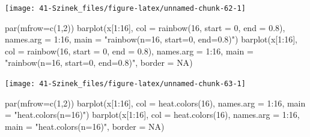 \documentclass[
]{book}
\newenvironment{Shaded}{\begin{snugshade}}{\end{snugshade}}
\newcommand{\AttributeTok}[1]{\textcolor[rgb]{0.77,0.63,0.00}{#1}}
\newcommand{\ConstantTok}[1]{\textcolor[rgb]{0.00,0.00,0.00}{#1}}
\newcommand{\DecValTok}[1]{\textcolor[rgb]{0.00,0.00,0.81}{#1}}
\newcommand{\FloatTok}[1]{\textcolor[rgb]{0.00,0.00,0.81}{#1}}
\newcommand{\FunctionTok}[1]{\textcolor[rgb]{0.00,0.00,0.00}{#1}}
\newcommand{\NormalTok}[1]{#1}
\newcommand{\SpecialCharTok}[1]{\textcolor[rgb]{0.00,0.00,0.00}{#1}}
\newcommand{\StringTok}[1]{\textcolor[rgb]{0.31,0.60,0.02}{#1}}
\begin{document}
\begin{center}\texttt{[image: 41-Szinek\_files/figure-latex/unnamed-chunk-62-1]} \end{center}

\begin{Shaded}
\begin{Highlighting}[]
\FunctionTok{par}\NormalTok{(}\AttributeTok{mfrow=}\FunctionTok{c}\NormalTok{(}\DecValTok{1}\NormalTok{,}\DecValTok{2}\NormalTok{))}
\FunctionTok{barplot}\NormalTok{(x[}\DecValTok{1}\SpecialCharTok{:}\DecValTok{16}\NormalTok{], }\AttributeTok{col =} \FunctionTok{rainbow}\NormalTok{(}\DecValTok{16}\NormalTok{, }\AttributeTok{start =} \DecValTok{0}\NormalTok{, }\AttributeTok{end =} \FloatTok{0.8}\NormalTok{), }\AttributeTok{names.arg =} \DecValTok{1}\SpecialCharTok{:}\DecValTok{16}\NormalTok{, }
    \AttributeTok{main =} \StringTok{"rainbow(n=16, start=0, end=0.8)"}\NormalTok{)}
\FunctionTok{barplot}\NormalTok{(x[}\DecValTok{1}\SpecialCharTok{:}\DecValTok{16}\NormalTok{], }\AttributeTok{col =} \FunctionTok{rainbow}\NormalTok{(}\DecValTok{16}\NormalTok{, }\AttributeTok{start =} \DecValTok{0}\NormalTok{, }\AttributeTok{end =} \FloatTok{0.8}\NormalTok{), }\AttributeTok{names.arg =} \DecValTok{1}\SpecialCharTok{:}\DecValTok{16}\NormalTok{, }
    \AttributeTok{main =} \StringTok{"rainbow(n=16, start=0, end=0.8)"}\NormalTok{, }\AttributeTok{border =} \ConstantTok{NA}\NormalTok{)}
\end{Highlighting}
\end{Shaded}

\begin{center}\texttt{[image: 41-Szinek\_files/figure-latex/unnamed-chunk-63-1]} \end{center}

\begin{Shaded}
\begin{Highlighting}[]
\FunctionTok{par}\NormalTok{(}\AttributeTok{mfrow=}\FunctionTok{c}\NormalTok{(}\DecValTok{1}\NormalTok{,}\DecValTok{2}\NormalTok{))}
\FunctionTok{barplot}\NormalTok{(x[}\DecValTok{1}\SpecialCharTok{:}\DecValTok{16}\NormalTok{], }\AttributeTok{col =} \FunctionTok{heat.colors}\NormalTok{(}\DecValTok{16}\NormalTok{), }\AttributeTok{names.arg =} \DecValTok{1}\SpecialCharTok{:}\DecValTok{16}\NormalTok{, }\AttributeTok{main =} \StringTok{"heat.colors(n=16)"}\NormalTok{)}
\FunctionTok{barplot}\NormalTok{(x[}\DecValTok{1}\SpecialCharTok{:}\DecValTok{16}\NormalTok{], }\AttributeTok{col =} \FunctionTok{heat.colors}\NormalTok{(}\DecValTok{16}\NormalTok{), }\AttributeTok{names.arg =} \DecValTok{1}\SpecialCharTok{:}\DecValTok{16}\NormalTok{, }\AttributeTok{main =} \StringTok{"heat.colors(n=16)"}\NormalTok{, }\AttributeTok{border =} \ConstantTok{NA}\NormalTok{)}
\end{Highlighting}
\end{Shaded}
\end{document}
